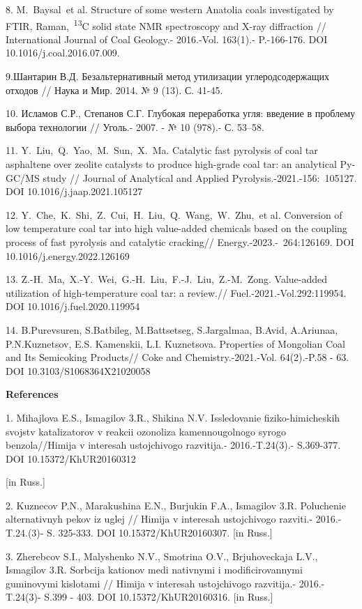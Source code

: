 8. M.~Baysal\emph{~}et al. Structure of some western Anatolia coals
investigated by FTIR, Raman,~\textsuperscript{13}C solid state NMR
spectroscopy and X-ray diffraction // International Journal of Coal
Geology.- 2016.-Vol. 163(1).- P.-166-176. DOI
10.1016/j.coal.2016.07.009.

9.Шантарин В.Д. Безальтернативный метод утилизации углеродсодержащих
отходов // Наука и Мир. 2014. № 9 (13). С. 41-45.

10. Исламов С.Р., Степанов С.Г. Глубокая переработка угля: введение в
проблему выбора технологии // Уголь.- 2007. - № 10 (978).- С. 53--58.

11. Y.~Liu,~Q.~Yao,~M.~Sun,~X.~Ma. Catalytic fast pyrolysis of coal tar
asphaltene over zeolite catalysts to produce high-grade coal tar: an
analytical Py-GC/MS study // Journal of Analytical and Applied
Pyrolysis.-2021.-156:~105127. DOI 10.1016/j.jaap.2021.105127

12. Y.~Che,~K.~Shi,~Z.~Cui,~H.~Liu,~Q.~Wang,~W.~Zhu,~et al. Conversion
of low temperature coal tar into high value-added chemicals based on the
coupling process of fast pyrolysis and catalytic cracking//
Energy.-2023.-~264:126169. DOI 10.1016/j.energy.2022.126169

13. Z.-H.~Ma,~X.-Y.~Wei,~G.-H.~Liu,~F.-J.~Liu,~Z.-M.~Zong. Value-added
utilization of high-temperature coal tar: a review.//
Fuel.-2021.-Vol.292:119954. DOI 10.1016/j.fuel.2020.119954

14. B.Purevsuren, S.Batbileg, M.Battsetseg, S.Jargalmaa, B.Avid,
A.Ariunaa, P.N.Kuznetsov, E.S. Kamenskii, L.I. Kuznetsova. Properties of
Mongolian Coal and Its Semicoking Products// Coke and
Chemistry.-2021.-Vol. 64(2).-P.58 - 63. DOI 10.3103/S1068364X21020058

{\bfseries References}

1. Mihajlova E.S., Ismagilov 3.R., Shikina N.V. Issledovanie
fiziko-himicheskih svojstv katalizatorov v reakcii ozonoliza
kamennougol\textquotesingle nogo syrogo benzola//Himija v interesah
ustojchivogo razvitija.- 2016.-T.24(3).- S.369-377. DOI
10.15372/KhUR20160312

{[}in Russ.{]}

2. Kuznecov P.N., Marakushina E.N., Burjukin F.A., Ismagilov 3.R.
Poluchenie al\textquotesingle ternativnyh pekov iz uglej // Himija v
interesah ustojchivogo razviti.- 2016.-T.24.(3)- S. 325-333. DOI
10.15372/KhUR20160307. {[}in Russ.{]}

3. Zherebcov S.I., Malyshenko N.V., Smotrina O.V., Brjuhoveckaja L.V.,
Ismagilov 3.R. Sorbcija kationov medi nativnymi i modificirovannymi
guminovymi kislotami // Himija v interesah ustojchivogo razvitija.-
2016.-T.24(3)- S.399 - 403. DOI 10.15372/KhUR20160316. {[}in Russ.{]}

